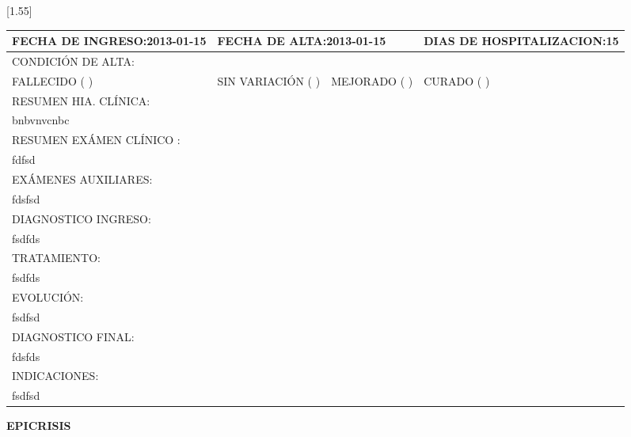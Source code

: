 \documentclass[10pt,a4paper]{article}
\begin{document}
\vspace{0.5cm}
\scalebox{1.40}[1.55]{
\begin{tabular}{|p{2.8cm}p{2.8cm}p{2.8cm}p{2.8cm}|} 
\hline 

\multicolumn{1}{|l}{\scriptsize{FECHA DE INGRESO:2013-01-15}}& \multicolumn{2}{l}{ \scriptsize{FECHA DE ALTA:2013-01-15}}& \multicolumn{1}{l|}{ \scriptsize{DIAS DE HOSPITALIZACION:15}}\\
\hline 
\multicolumn{4}{|l|}{\scriptsize{CONDICI\'ON DE ALTA:}}\\
\multicolumn{1}{|l}{\scriptsize{FALLECIDO ( )}}&\multicolumn{1}{l}{\scriptsize{SIN VARIACI\'ON ( )}}&\multicolumn{1}{l}{\scriptsize{MEJORADO ( )}}&\multicolumn{1}{l|}{\scriptsize{CURADO ( )}}\\
\hline 
\multicolumn{4}{|l|}{\scriptsize{RESUMEN HIA. CL\'INICA:}}\\
\multicolumn{4}{|p{12.5cm}|}{\scriptsize{bnbvnvcnbc				}}\\ 
\hline 
\multicolumn{4}{|l|}{\scriptsize{RESUMEN EX\'AMEN CL\'INICO :}}\\
\multicolumn{4}{|p{12.5cm}|}{\scriptsize{fdfsd}}\\ 
\hline 
\multicolumn{4}{|l|}{\scriptsize{EX\'AMENES AUXILIARES:}}\\
\multicolumn{4}{|p{12.5cm}|}{\scriptsize{fdsfsd}}\\ 
\hline 
\multicolumn{4}{|l|}{\scriptsize{DIAGNOSTICO INGRESO:}}\\
\multicolumn{4}{|p{12.5cm}|}{\scriptsize{fsdfds}}\\ 
\hline 
\multicolumn{4}{|l|}{\scriptsize{TRATAMIENTO:}}\\
\multicolumn{4}{|p{12.5cm}|}{\scriptsize{fsdfds}}\\ 
\hline 
\multicolumn{4}{|l|}{\scriptsize{EVOLUCI\'ON:}}\\
\multicolumn{4}{|p{12.5cm}|}{\scriptsize{fsdfsd}}\\ 
\hline 
\multicolumn{4}{|l|}{\scriptsize{DIAGNOSTICO FINAL:}}\\
\multicolumn{4}{|p{12.5cm}|}{\scriptsize{fdsfds}}\\ 
\hline 
\multicolumn{4}{|l|}{\scriptsize{INDICACIONES:}}\\
\multicolumn{4}{|p{12.5cm}|}{\scriptsize{fsdfsd}}\\ 
\hline 
\end{tabular}}
\vspace{0.6cm}
\begin{flushleft}
\begin{LARGE}
\textbf{EPICRISIS}
\end{LARGE}
\end{flushleft}
\end{document}
